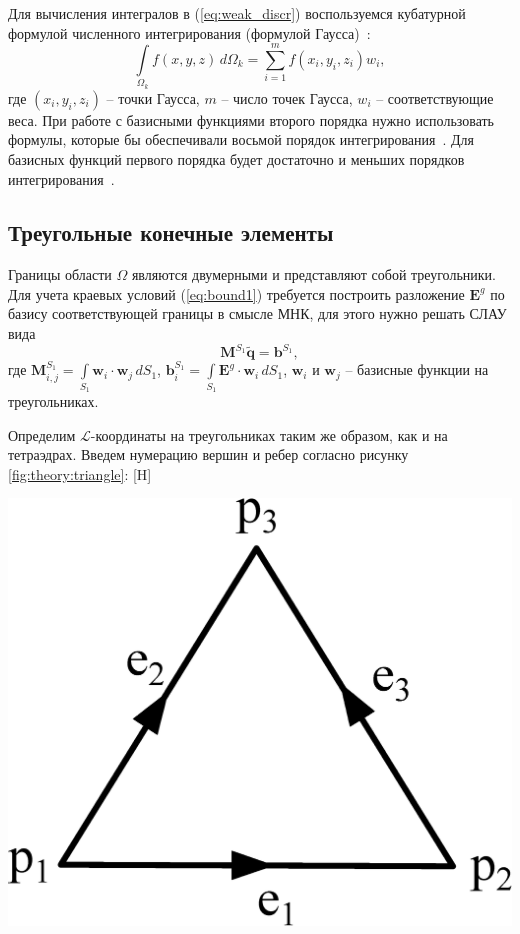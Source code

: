 \documentclass[a4paper,14pt]{article}
\makeatletter
\renewenvironment{figure}[1][\fps@figure]{
  \edef\@tempa{\noexpand\@float{figure}[#1]}
  \@tempa
  \addtocounter{foofigure}{1}
}{
  \end@float
}
\makeatother
\begin{document}
Для вычисления интегралов в (\ref{eq:weak_discr}) воспользуемся кубатурной формулой численного интегрирования (формулой Гаусса)~\citep{misovskih}:
\begin{equation*}
	\int\limits_{\Omega_k} f(x, y, z) \,d\Omega_k = \sum\limits_{i = 1}^m f( x_i , y_i , z_i ) w_i ,
\end{equation*}
где $(x_i , y_i , z_i )$ -- точки Гаусса, $m$ -- число точек Гаусса, $w_i$ -- соответствующие веса. При работе с базисными функциями второго порядка нужно использовать формулы, которые бы обеспечивали восьмой порядок интегрирования~\citep{zhang_integration}. Для базисных функций первого порядка будет достаточно и меньших порядков интегрирования~\citep{tet_integration, misovskih}.


\subsection{Треугольные конечные элементы}

Границы области $\Omega$ являются двумерными и представляют собой треугольники. Для учета краевых условий (\ref{eq:bound1}) требуется построить разложение $\mathbf{E}^g$ по базису соответствующей границы в смысле МНК, для этого нужно решать СЛАУ вида
\begin{equation}
	\mathbf{M}^{S_1} \tilde{\mathbf{q}} = \mathbf{b}^{S_1} ,
	\label{eq:bound_mnk}
\end{equation}
где $\displaystyle \mathbf{M}^{S_1}_{i,j} = \int\limits_{S_1} \mathbf{w}_i \cdot \mathbf{w}_j \,d S_1$, $\displaystyle \mathbf{b}^{S_1}_{i} = \int\limits_{S_1} \mathbf{E}^g \cdot \mathbf{w}_i \,d S_1$, $\mathbf{w}_i$ и $\mathbf{w}_j$ -- базисные функции на треугольниках.

Определим $\mathcal{L}$-координаты на треугольниках таким же образом, как и на тетраэдрах. Введем нумерацию вершин и ребер согласно рисунку \ref{fig:theory:triangle}:
\begin{figure}[H]
	\centering
	\includegraphics[scale=0.25]{theory/triangle.eps}
	\caption{треугольный конечный элемент}
	\label{fig:theory:triangle}
\end{figure}
\end{document}
